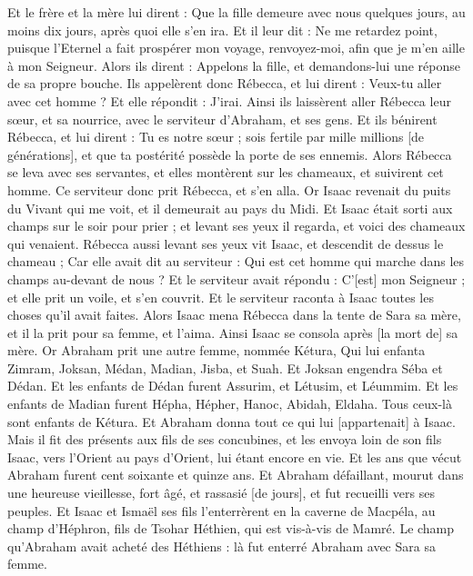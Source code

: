 \begin{multicols}{2}
Et le frère et la mère lui dirent : Que la fille demeure avec nous quelques jours, au moins dix jours, après quoi elle s'en ira.
Et il leur dit : Ne me retardez point, puisque l'Eternel a fait prospérer mon voyage, renvoyez-moi, afin que je m'en aille à mon Seigneur.
Alors ils dirent : Appelons la fille, et demandons-lui une réponse de sa propre bouche.
Ils appelèrent donc Rébecca, et lui dirent : Veux-tu aller avec cet homme ? Et elle répondit : J'irai.
Ainsi ils laissèrent aller Rébecca leur sœur, et sa nourrice, avec le serviteur d'Abraham, et ses gens.
Et ils bénirent Rébecca, et lui dirent : Tu es notre sœur ; sois fertile par mille millions [de générations], et que ta postérité possède la porte de ses ennemis.
Alors Rébecca se leva avec ses servantes, et elles montèrent sur les chameaux, et suivirent cet homme. Ce serviteur donc prit Rébecca, et s'en alla.
Or Isaac revenait du puits du Vivant qui me voit, et il demeurait au pays du Midi.
Et Isaac était sorti aux champs sur le soir pour prier ; et levant ses yeux il regarda, et voici des chameaux qui venaient.
Rébecca aussi levant ses yeux vit Isaac, et descendit de dessus le chameau ;
Car elle avait dit au serviteur : Qui est cet homme qui marche dans les champs au-devant de nous ? Et le serviteur avait répondu : C'[est] mon Seigneur ; et elle prit un voile, et s'en couvrit.
Et le serviteur raconta à Isaac toutes les choses qu'il avait faites.
Alors Isaac mena Rébecca dans la tente de Sara sa mère, et il la prit pour sa femme, et l'aima. Ainsi Isaac se consola après [la mort de] sa mère.
\VerseOne{}Or Abraham prit une autre femme, nommée Kétura,
Qui lui enfanta Zimram, Joksan, Médan, Madian, Jisba, et Suah.
Et Joksan engendra Séba et Dédan. Et les enfants de Dédan furent Assurim, et Létusim, et Léummim.
Et les enfants de Madian furent Hépha, Hépher, Hanoc, Abidah, Eldaha. Tous ceux-là sont enfants de Kétura.
Et Abraham donna tout ce qui lui [appartenait] à Isaac.
Mais il fit des présents aux fils de ses concubines, et les envoya loin de son fils Isaac, vers l'Orient au pays d'Orient, lui étant encore en vie.
Et les ans que vécut Abraham furent cent soixante et quinze ans.
Et Abraham défaillant, mourut dans une heureuse vieillesse, fort âgé, et rassasié [de jours], et fut recueilli vers ses peuples.
Et Isaac et Ismaël ses fils l'enterrèrent en la caverne de Macpéla, au champ d'Héphron, fils de Tsohar Héthien, qui est vis-à-vis de Mamré.
Le champ qu'Abraham avait acheté des Héthiens : là fut enterré Abraham avec Sara sa femme.

\end{multicols}
